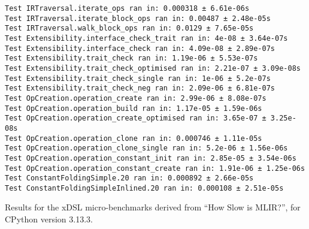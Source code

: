 \begin{code}
    \begin{verbatim}
Test IRTraversal.iterate_ops ran in: 0.000318 ± 6.61e-06s
Test IRTraversal.iterate_block_ops ran in: 0.00487 ± 2.48e-05s
Test IRTraversal.walk_block_ops ran in: 0.0129 ± 7.65e-05s
Test Extensibility.interface_check_trait ran in: 4e-08 ± 3.64e-07s
Test Extensibility.interface_check ran in: 4.09e-08 ± 2.89e-07s
Test Extensibility.trait_check ran in: 1.19e-06 ± 5.53e-07s
Test Extensibility.trait_check_optimised ran in: 2.21e-07 ± 3.09e-08s
Test Extensibility.trait_check_single ran in: 1e-06 ± 5.2e-07s
Test Extensibility.trait_check_neg ran in: 2.09e-06 ± 6.81e-07s
Test OpCreation.operation_create ran in: 2.99e-06 ± 8.08e-07s
Test OpCreation.operation_build ran in: 1.17e-05 ± 1.59e-06s
Test OpCreation.operation_create_optimised ran in: 3.65e-07 ± 3.25e-08s
Test OpCreation.operation_clone ran in: 0.000746 ± 1.11e-05s
Test OpCreation.operation_clone_single ran in: 5.2e-06 ± 1.56e-06s
Test OpCreation.operation_constant_init ran in: 2.85e-05 ± 3.54e-06s
Test OpCreation.operation_constant_create ran in: 1.91e-06 ± 1.25e-06s
Test ConstantFoldingSimple.20 ran in: 0.000892 ± 2.66e-05s
Test ConstantFoldingSimpleInlined.20 ran in: 0.000108 ± 2.51e-05s
    \end{verbatim}
    \caption{Results for the xDSL micro-benchmarks derived from ``How Slow is MLIR?'', for CPython version 3.13.3.}
    \label{listing:how-slow-is-mlir-xdsl-microbenchmark-results-313}
\end{code}



